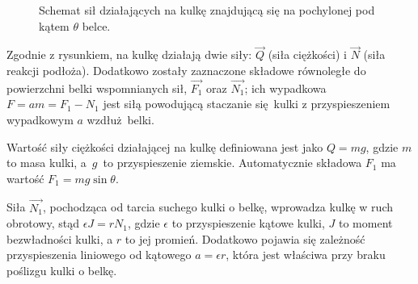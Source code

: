 \begin{figure}[ht]
    \centering
    
    \caption{Schemat sił działających na kulkę znajdującą się na pochylonej pod kątem $\theta$ belce.}
    \label{fig:sily_dzialajace_na_kulke}
\end{figure}

Zgodnie z rysunkiem, na kulkę działają dwie siły: $\vec{Q}$ (siła ciężkości) i $\vec{N}$ (siła reakcji podłoża). Dodatkowo zostały zaznaczone składowe równoległe do powierzchni belki wspomnianych sił, $\vec{F_1}$ oraz $\vec{N_1}$; ich wypadkowa $F = am = F_1 - N_1$ jest siłą powodującą staczanie się kulki z przyspieszeniem wypadkowym $a$ wzdłuż belki.

Wartość siły ciężkości działającej na kulkę definiowana jest jako $Q=mg$, gdzie $m$ to masa kulki, a~$g$~to przyspieszenie ziemskie. Automatycznie składowa $F_1$ ma wartość $F_1=mg\sin\theta$.

Siła $\vec{N_1}$, pochodząca od tarcia suchego kulki o belkę, wprowadza kulkę w ruch obrotowy, stąd $\epsilon J = r N_1$, gdzie $\epsilon$ to przyspieszenie kątowe kulki, $J$ to moment bezwładności kulki, a $r$ to jej promień. Dodatkowo pojawia się zależność przyspieszenia liniowego od kątowego $a = \epsilon r$, która jest właściwa przy braku poślizgu kulki o belkę.

